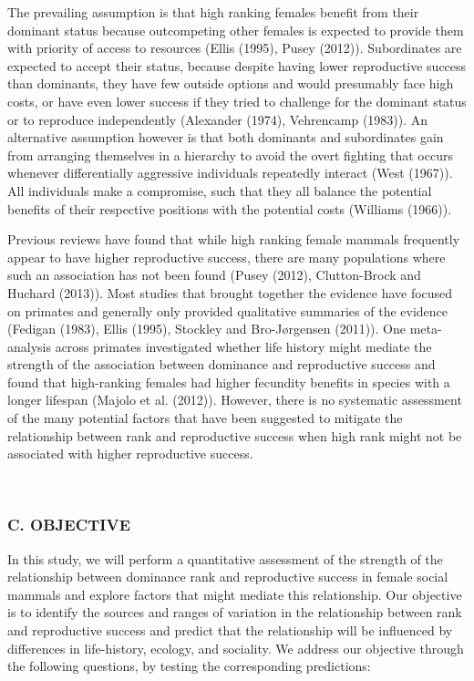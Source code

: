 \documentclass[]{article}
\begin{document}
The prevailing assumption is that high ranking females benefit from
their dominant status because outcompeting other females is expected to
provide them with priority of access to resources (Ellis (1995), Pusey
(2012)). Subordinates are expected to accept their status, because
despite having lower reproductive success than dominants, they have few
outside options and would presumably face high costs, or have even lower
success if they tried to challenge for the dominant status or to
reproduce independently (Alexander (1974), Vehrencamp (1983)). An
alternative assumption however is that both dominants and subordinates
gain from arranging themselves in a hierarchy to avoid the overt
fighting that occurs whenever differentially aggressive individuals
repeatedly interact (West (1967)). All individuals make a compromise,
such that they all balance the potential benefits of their respective
positions with the potential costs (Williams (1966)).

Previous reviews have found that while high ranking female mammals
frequently appear to have higher reproductive success, there are many
populations where such an association has not been found (Pusey (2012),
Clutton-Brock and Huchard (2013)). Most studies that brought together
the evidence have focused on primates and generally only provided
qualitative summaries of the evidence (Fedigan (1983), Ellis (1995),
Stockley and Bro-Jørgensen (2011)). One meta-analysis across primates
investigated whether life history might mediate the strength of the
association between dominance and reproductive success and found that
high-ranking females had higher fecundity benefits in species with a
longer lifespan (Majolo et al. (2012)). However, there is no systematic
assessment of the many potential factors that have been suggested to
mitigate the relationship between rank and reproductive success when
high rank might not be associated with higher reproductive success.

~

\hypertarget{c.-objective}{%
\subsubsection{C. OBJECTIVE}\label{c.-objective}}

In this study, we will perform a quantitative assessment of the strength
of the relationship between dominance rank and reproductive success in
female social mammals and explore factors that might mediate this
relationship. Our objective is to identify the sources and ranges of
variation in the relationship between rank and reproductive success and
predict that the relationship will be influenced by differences in
life-history, ecology, and sociality. We address our objective through
the following questions, by testing the corresponding predictions:
\end{document}
